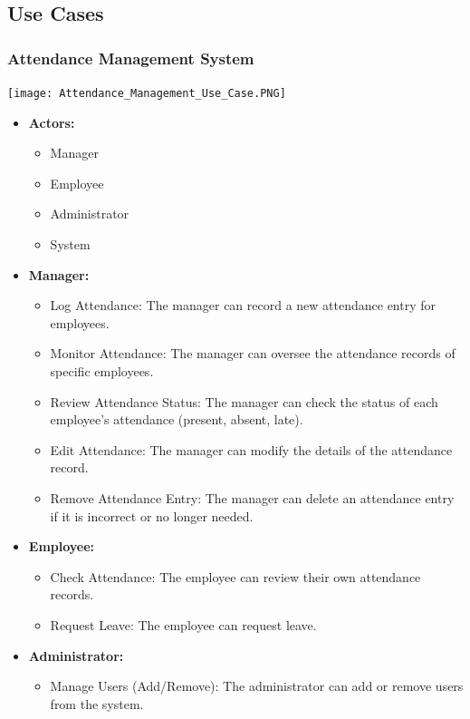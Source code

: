 \documentclass[a4paper, 12pt]{article}
\begin{document}
\subsection{Use Cases}
\subsubsection{Attendance Management System}
\begin{center}
\texttt{[image: Attendance\_Management\_Use\_Case.PNG]}\par
\end{center}
\begin{itemize}
    \item \textbf{Actors:}
    \begin{itemize}
        \item Manager
        \item Employee
        \item Administrator
        \item System
    \end{itemize}
    \item \textbf{Manager:}
    \begin{itemize}
        \item Log Attendance: The manager can record a new attendance entry for employees.
        \item Monitor Attendance: The manager can oversee the attendance records of specific employees.
        \item Review Attendance Status: The manager can check the status of each employee’s attendance (present, absent, late).
        \item Edit Attendance: The manager can modify the details of the attendance record.
        \item Remove Attendance Entry: The manager can delete an attendance entry if it is incorrect or no longer needed.
    \end{itemize}
    \newpage
    \item \textbf{Employee:}
    \begin{itemize}
        \item Check Attendance: The employee can review their own attendance records.
        \item Request Leave: The employee can request leave.
    \end{itemize}
    \item \textbf{Administrator:}
    \begin{itemize}
        \item Manage Users (Add/Remove): The administrator can add or remove users from the system.

\end{itemize}
\end{itemize}
\end{document}
